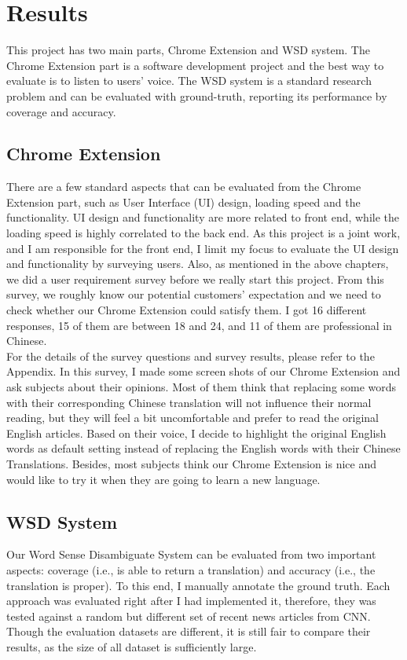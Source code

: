 \section{Results}
This project has two main parts, Chrome Extension and WSD system. The Chrome Extension part is a  software development project and the best way to evaluate is to listen to users' voice. The WSD system is a standard research problem and can be evaluated with ground-truth, reporting its performance
by coverage and accuracy.
\subsection{Chrome Extension}
There are a few standard aspects that can be evaluated from the Chrome Extension part, such as User Interface (UI) design, loading speed and the functionality. UI design and functionality are more related to front end, while the loading speed is highly correlated to the back end. As this project is a joint work, and I am responsible  for the front end, I limit my focus to evaluate the UI design and functionality by surveying users.
Also, as mentioned in the above chapters, we did a user requirement survey before we really start this project. From this survey, we roughly know  our potential customers' expectation and we need to check whether our Chrome Extension could satisfy them. I got 16 different responses, 15 of them are between 18 and 24, and 11 of them are professional in Chinese.
\\
For the details of the survey questions and survey results, please refer to the Appendix. In this survey, I made some screen shots of our Chrome Extension and ask subjects about their opinions. 
Most of them think that replacing some words with their corresponding Chinese translation will not influence their normal reading, but they will feel a bit uncomfortable and prefer to read the original English articles. Based on their voice, I decide to highlight the original English words as default setting instead of replacing the English words with their Chinese Translations. Besides, most subjects think our Chrome Extension is nice and would like to try it when they are going to learn a new language.
\\
\subsection{WSD System}
Our Word Sense Disambiguate System can be evaluated from two important aspects: coverage (i.e., is able to return a translation) and accuracy (i.e., the translation is proper). To this end, I manually annotate the ground truth. Each approach was evaluated  right after I had implemented it, therefore,  they was tested against a random but different set of recent news articles from CNN.  Though the evaluation datasets are different, it is still fair to compare their results, as the size of all dataset is sufficiently large. 


